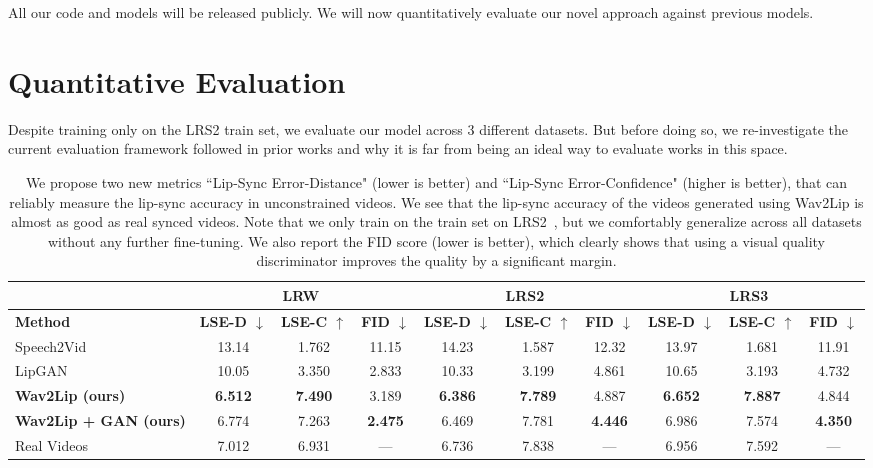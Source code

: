 \documentclass[sigconf]{acmart}
\begin{document}
All our code and models will be released publicly. We will now quantitatively evaluate our novel approach against previous models.

\section{Quantitative Evaluation}
\label{section:quanteval}
Despite training only on the LRS2 train set, we evaluate our model across $3$ different datasets. But before doing so, we re-investigate the current evaluation framework followed in prior works and why it is far from being an ideal way to evaluate works in this space.

\begin{table*}[ht]
  \setlength{\tabcolsep}{4pt}
    \centering
    
    \begin{tabular}{|l||c|c|c||c|c|c||c|c|c|}
    \hline
    & \multicolumn{3}{c||}{LRW~\cite{chung2016lip}} & \multicolumn{3}{c||}{LRS2~\cite{Afouras18c}} & \multicolumn{3}{c|}{LRS3~\cite{afouras2018lrs3}}
     \\
    \hline
    \textbf{Method} & \textbf{LSE-D	$\downarrow$} & \textbf{LSE-C $\uparrow$} & \textbf{FID $\downarrow$} & \textbf{LSE-D $\downarrow$} & \textbf{LSE-C $\uparrow$} & \textbf{FID $\downarrow$} & \textbf{LSE-D $\downarrow$} & \textbf{LSE-C $\uparrow$} & \textbf{FID	$\downarrow$} \\
    \hline
    Speech2Vid~\cite{jamaludin2019you} & 13.14 & 1.762 & 11.15 & 14.23 & 1.587 & 12.32 & 13.97 & 1.681 & 11.91\\
    LipGAN~\cite{kr2019towards} & 10.05 & 3.350 & 2.833 & 10.33 & 3.199 & 4.861 & 10.65 & 3.193 & 4.732 \\
    \textbf{Wav2Lip (ours)} & \textbf{6.512} & \textbf{7.490} & 3.189 & \textbf{6.386} & \textbf{7.789} & 4.887 & \textbf{6.652} & \textbf{7.887} & 4.844 \\
    \textbf{Wav2Lip + GAN (ours)} & 6.774 & 7.263 & \textbf{2.475} & 6.469 & 7.781 & \textbf{4.446} & 6.986 & 7.574 & \textbf{4.350} \\
    \hline
    Real Videos & 7.012  & 6.931  & --- & 6.736 & 7.838 & --- & 6.956 & 7.592 & --- \\
    \hline
    
    \end{tabular}
    \caption{We propose two new metrics ``Lip-Sync Error-Distance" (lower is better) and ``Lip-Sync Error-Confidence" (higher is better), that can reliably measure the lip-sync accuracy in unconstrained videos. We see that the lip-sync accuracy of the videos generated using Wav2Lip is almost as good as real synced videos. Note that we only train on the train set on LRS2~\cite{Afouras18c}, but we comfortably generalize across all datasets without any further fine-tuning. We also report the FID score (lower is better), which clearly shows that using a visual quality discriminator improves the quality by a significant margin.}
    \vspace{-0.7cm}
    \label{tab:lse_scores}
\end{table*}
\end{document}
